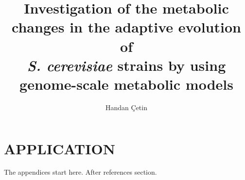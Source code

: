 \documentclass[a4paper,onesided,12pt]{report}
\title{Investigation of the metabolic changes in the adaptive evolution of \\
\emph{S. cerevisiae} strains by using genome-scale metabolic models}
\author{Handan Çetin}
\begin{document}
\makemstitle %
\tableofcontents
\listoffigures
\listoftables

%







%


% 
% 





\appendix
\chapter{APPLICATION}
The appendices start here. After references section.
\end{document}
